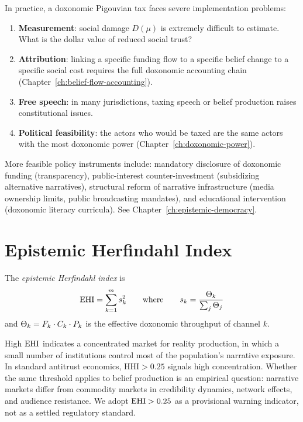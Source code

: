 \begin{remark}
\label{rem:pigouvian-difficulty}
In practice, a doxonomic Pigouvian tax faces severe implementation problems:
\begin{enumerate}[nosep]
  \item \textbf{Measurement}: social damage $D(\mu)$ is extremely difficult to estimate.
  What is the dollar value of reduced social trust?
  \item \textbf{Attribution}: linking a specific funding flow to a specific belief change to a specific social cost requires the full doxonomic accounting chain (Chapter~\ref{ch:belief-flow-accounting}).
  \item \textbf{Free speech}: in many jurisdictions, taxing speech or belief production raises constitutional issues.
  \item \textbf{Political feasibility}: the actors who would be taxed are the same actors with the most doxonomic power (Chapter~\ref{ch:doxonomic-power}).
\end{enumerate}
More feasible policy instruments include: mandatory disclosure of doxonomic funding (transparency), public-interest counter-investment (subsidizing alternative narratives), structural reform of narrative infrastructure (media ownership limits, public broadcasting mandates), and educational intervention (doxonomic literacy curricula).
See Chapter~\ref{ch:epistemic-democracy}.
\end{remark}


\section{Epistemic Herfindahl Index}
\label{sec:ch10-ehhi}

\begin{definition}[EHI]
\label{def:ehhi}
The \emph{epistemic Herfindahl index} is
\[
  \mathrm{EHI} = \sum_{k=1}^{m} s_k^2 \qquad \text{where} \qquad s_k = \frac{\Theta_k}{\sum_{j} \Theta_j}
\]
and $\Theta_k = F_{k} \cdot C_{k} \cdot P_{k}$ is the effective doxonomic throughput of channel $k$.
\end{definition}

High $\mathrm{EHI}$ indicates a concentrated market for reality production, in which a small number of institutions control most of the population's narrative exposure.
In standard antitrust economics, $\mathrm{HHI} > 0.25$ signals high concentration.
Whether the same threshold applies to belief production is an empirical question: narrative markets differ from commodity markets in credibility dynamics, network effects, and audience resistance.
We adopt $\mathrm{EHI} > 0.25$ as a provisional warning indicator, not as a settled regulatory standard.

